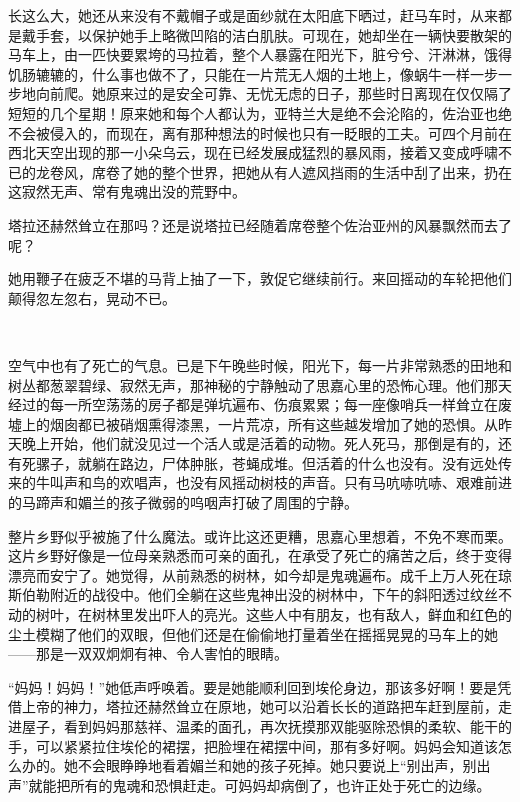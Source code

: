 \par 长这么大，她还从来没有不戴帽子或是面纱就在太阳底下晒过，赶马车时，从来都是戴手套，以保护她手上略微凹陷的洁白肌肤。可现在，她却坐在一辆快要散架的马车上，由一匹快要累垮的马拉着，整个人暴露在阳光下，脏兮兮、汗淋淋，饿得饥肠辘辘的，什么事也做不了，只能在一片荒无人烟的土地上，像蜗牛一样一步一步地向前爬。她原来过的是安全可靠、无忧无虑的日子，那些时日离现在仅仅隔了短短的几个星期！原来她和每个人都认为，亚特兰大是绝不会沦陷的，佐治亚也绝不会被侵入的，而现在，离有那种想法的时候也只有一眨眼的工夫。可四个月前在西北天空出现的那一小朵乌云，现在已经发展成猛烈的暴风雨，接着又变成呼啸不已的龙卷风，席卷了她的整个世界，把她从有人遮风挡雨的生活中刮了出来，扔在这寂然无声、常有鬼魂出没的荒野中。
\par 塔拉还赫然耸立在那吗？还是说塔拉已经随着席卷整个佐治亚州的风暴飘然而去了呢？
\par 她用鞭子在疲乏不堪的马背上抽了一下，敦促它继续前行。来回摇动的车轮把他们颠得忽左忽右，晃动不已。
\par  
\par 空气中也有了死亡的气息。已是下午晚些时候，阳光下，每一片非常熟悉的田地和树丛都葱翠碧绿、寂然无声，那神秘的宁静触动了思嘉心里的恐怖心理。他们那天经过的每一所空荡荡的房子都是弹坑遍布、伤痕累累；每一座像哨兵一样耸立在废墟上的烟囱都已被硝烟熏得漆黑，一片荒凉，所有这些越发增加了她的恐惧。从昨天晚上开始，他们就没见过一个活人或是活着的动物。死人死马，那倒是有的，还有死骡子，就躺在路边，尸体肿胀，苍蝇成堆。但活着的什么也没有。没有远处传来的牛叫声和鸟的欢唱声，也没有风摇动树枝的声音。只有马吭哧吭哧、艰难前进的马蹄声和媚兰的孩子微弱的呜咽声打破了周围的宁静。
\par 整片乡野似乎被施了什么魔法。或许比这还更糟，思嘉心里想着，不免不寒而栗。这片乡野好像是一位母亲熟悉而可亲的面孔，在承受了死亡的痛苦之后，终于变得漂亮而安宁了。她觉得，从前熟悉的树林，如今却是鬼魂遍布。成千上万人死在琼斯伯勒附近的战役中。他们全躺在这些鬼神出没的树林中，下午的斜阳透过纹丝不动的树叶，在树林里发出吓人的亮光。这些人中有朋友，也有敌人，鲜血和红色的尘土模糊了他们的双眼，但他们还是在偷偷地打量着坐在摇摇晃晃的马车上的她——那是一双双炯炯有神、令人害怕的眼睛。
\par “妈妈！妈妈！”她低声呼唤着。要是她能顺利回到埃伦身边，那该多好啊！要是凭借上帝的神力，塔拉还赫然耸立在原地，她可以沿着长长的道路把车赶到屋前，走进屋子，看到妈妈那慈祥、温柔的面孔，再次抚摸那双能驱除恐惧的柔软、能干的手，可以紧紧拉住埃伦的裙摆，把脸埋在裙摆中间，那有多好啊。妈妈会知道该怎么办的。她不会眼睁睁地看着媚兰和她的孩子死掉。她只要说上“别出声，别出声”就能把所有的鬼魂和恐惧赶走。可妈妈却病倒了，也许正处于死亡的边缘。

